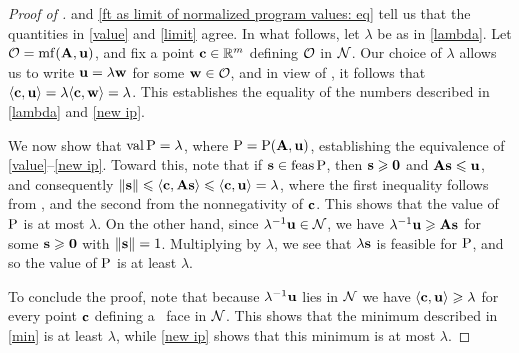 \documentclass{article}
\begin{document}
\begin{proof}[Proof of ]
    and \eqref{ft as limit of normalized program values: eq} tell us that the quantities in \ref{value} and \ref{limit} agree.  In what follows, let $\lambda$ be as in \ref{lambda}.
   Let $\mathcal{O} = \operatorname{mf}(\mathbf{A},\mathbf{u})$, and fix a point $\mathbf{c} \in \mathbb{R}^m$ defining $\mathcal{O}$ in $\mathcal{N}$.
   Our choice of $\lambda$ allows us to write $\mathbf{u} = \lambda \mathbf{w}$ for some $\mathbf{w} \in \mathcal{O}$, and in view of , it follows that $\langle \mathbf{c}, \mathbf{u} \rangle = \lambda \langle \mathbf{c}, \mathbf{w} \rangle = \lambda$.
   This establishes the equality of the numbers described in \ref{lambda} and \ref{new ip}.

   We now show that $\operatorname{val} \mathrm{P} = \lambda$, where $\mathrm{P} = \mathrm{P}(\mathbf{A}, \mathbf{u})$, establishing the equivalence of \ref{value}--\ref{new ip}.
   Toward this, note that if $\mathbf{s} \in \operatorname{feas} \mathrm{P}$, then $\mathbf{s}\geqslant \mathbf{0}$ and $\mathbf{A} \mathbf{s} \leqslant \mathbf{u}$, and consequently $\| \mathbf{s} \| \leqslant \langle \mathbf{c}, \mathbf{A} \mathbf{s} \rangle \leqslant \langle \mathbf{c}, \mathbf{u} \rangle = \lambda$, where the first inequality follows from , and the second from the nonnegativity of $\mathbf{c}$.
   This shows that the value of $\mathrm{P}$ is at most $\lambda$.
   On the other hand, since $\lambda^{-1}\mathbf{u} \in \mathcal{N}$, we have $\lambda^{-1}\mathbf{u} \geqslant \mathbf{A}\mathbf{s}$ for some $\mathbf{s} \geqslant \mathbf{0}$ with $\| \mathbf{s} \| = 1$.
   Multiplying by $\lambda$, we see that  $\lambda\mathbf{s}$ is feasible for $\mathrm{P}$, and so the value of $\mathrm{P}$ is at least $\lambda$.

   To conclude the proof, note that because $\lambda^{-1}\mathbf{u}$ lies in $\mathcal{N}$ we have $\langle \mathbf{c}, \mathbf{u} \rangle \geqslant \lambda$ for every point $\mathbf{c}$ defining a \positive\ face in $\mathcal{N}$.
   This shows that the minimum described in \ref{min} is at least $\lambda$, while \ref{new ip} shows that this minimum is at most $\lambda$.
\end{proof}
\end{document}
